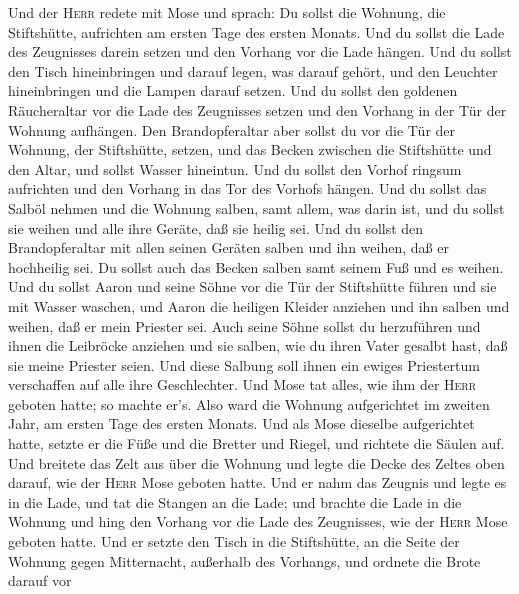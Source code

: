  Und der \textsc{Herr} redete mit Mose und sprach:
 Du sollst die Wohnung, die Stiftshütte, aufrichten am
ersten Tage des ersten Monats.  Und du sollst die Lade des
Zeugnisses darein setzen und den Vorhang vor die Lade hängen.
 Und du sollst den Tisch hineinbringen und darauf legen,
was darauf gehört, und den Leuchter hineinbringen und die Lampen darauf
setzen.  Und du sollst den goldenen Räucheraltar vor die
Lade des Zeugnisses setzen und den Vorhang in der Tür der Wohnung
aufhängen.  Den Brandopferaltar aber sollst du vor die Tür
der Wohnung, der Stiftshütte, setzen,  und das Becken
zwischen die Stiftshütte und den Altar, und sollst Wasser hineintun.
 Und du sollst den Vorhof ringsum aufrichten und den
Vorhang in das Tor des Vorhofs hängen.  Und du sollst das
Salböl nehmen und die Wohnung salben, samt allem, was darin ist, und du
sollst sie weihen und alle ihre Geräte, daß sie heilig sei.
 Und du sollst den Brandopferaltar mit allen seinen
Geräten salben und ihn weihen, daß er hochheilig sei.  Du
sollst auch das Becken salben samt seinem Fuß und es weihen.
 Und du sollst Aaron und seine Söhne vor die Tür der
Stiftshütte führen und sie mit Wasser waschen,  und Aaron
die heiligen Kleider anziehen und ihn salben und weihen, daß er mein
Priester sei.  Auch seine Söhne sollst du herzuführen und
ihnen die Leibröcke anziehen  und sie salben, wie du
ihren Vater gesalbt hast, daß sie meine Priester seien. Und diese
Salbung soll ihnen ein ewiges Priestertum verschaffen auf alle ihre
Geschlechter.  Und Mose tat alles, wie ihm der
\textsc{Herr} geboten hatte; so machte er's.  Also ward
die Wohnung aufgerichtet im zweiten Jahr, am ersten Tage des ersten
Monats.  Und als Mose dieselbe aufgerichtet hatte, setzte
er die Füße und die Bretter und Riegel, und richtete die Säulen auf.
 Und breitete das Zelt aus über die Wohnung und legte die
Decke des Zeltes oben darauf, wie der \textsc{Herr} Mose geboten hatte.
 Und er nahm das Zeugnis und legte es in die Lade, und
tat die Stangen an die Lade;  und brachte die Lade in die
Wohnung und hing den Vorhang vor die Lade des Zeugnisses, wie der
\textsc{Herr} Mose geboten hatte.  Und er setzte den
Tisch in die Stiftshütte, an die Seite der Wohnung gegen Mitternacht,
außerhalb des Vorhangs,  und ordnete die Brote darauf vor
